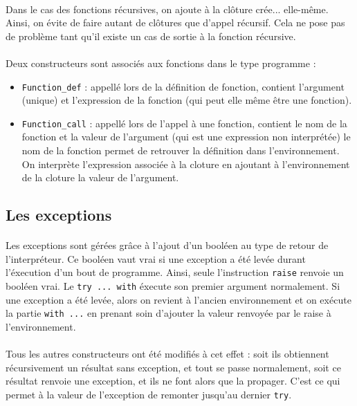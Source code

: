 \paragraph{} Dans le cas des fonctions récursives, on ajoute à la clôture crée... elle-même. Ainsi, on évite de faire autant de clôtures que d'appel récursif. Cela ne pose pas de problème tant qu'il existe un cas de sortie à la fonction récursive.

\paragraph{} Deux constructeurs sont associés aux fonctions dans le type programme :
    \begin{itemize}
     \item \texttt{Function\_def} : appellé lors de la définition de fonction, contient l'argument (unique) et l'expression de la fonction (qui peut elle même être une fonction).
     \item \texttt{Function\_call} : appellé lors de l'appel à une fonction, contient le nom de la fonction et la valeur de l'argument (qui est une expression non interprétée)
                        le nom de la fonction permet de retrouver la définition dans l'environnement. On interprète l'expression associée à la cloture en ajoutant à l'environnement de la cloture la valeur de l'argument.
    \end{itemize}


\subsection{Les exceptions}

\paragraph{} Les exceptions sont gérées grâce à l'ajout d'un booléen au type de retour de l'interpréteur. Ce booléen vaut vrai si une exception a été levée durant l'éxecution d'un bout de programme. Ainsi, seule l'instruction \texttt{raise} renvoie un booléen vrai. Le \texttt{try ... with} éxecute son premier argument normalement. Si une exception a été levée, alors on revient à l'ancien environnement et on exécute la partie \texttt{with ...} en prenant soin d'ajouter la valeur renvoyée par le raise à l'environnement.

\paragraph{} Tous les autres constructeurs ont été modifiés à cet effet : soit ils obtiennent récursivement un résultat sans exception, et tout se passe normalement, soit ce résultat renvoie une exception, et ils ne font alors que la propager. C'est ce qui permet à la valeur de l'exception de remonter jusqu'au dernier \texttt{try}.

